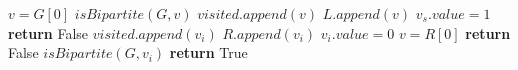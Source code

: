    \State $v = G[0]$
    \State $isBipartite(G, v)$
\EndIf
\State $visited.append(v)$
\State $L.append(v)$ 
\State $v_s.value = 1$ 
            \State \textbf{return} False
        \EndIf
        \State $visited.append(v_i)$
        \State $R.append(v_i)$ 
        \State $v_i.value = 0$ 
    \EndIf
\EndFor
\State $v = R[0]$
            \State \textbf{return} False 
        \EndIf
        \State $isBipartite(G, v_i)$ 
    \EndIf
\EndFor
{}
    \State \textbf{return} True
\EndIf
\EndProcedure